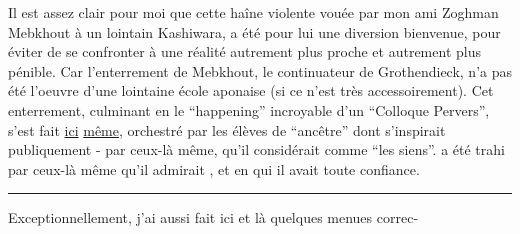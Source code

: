 Il est assez clair pour moi que cette haîne violente vouée par mon ami Zoghman Mebkhout à un lointain Kashiwara, a été pour lui une diversion bienvenue, pour éviter de se confronter à une réalité autrement plus proche et autrement plus pénible. Car l'enterrement de Mebkhout, le continuateur  de Grothendieck, n'a pas été l'oeuvre d'une lointaine école aponaise (si ce n'est très accessoirement). Cet enterrement, culminant en le ``happening'' incroyable d'un ``Colloque Pervers'', s'est fait \uline{ici} \uline{même},  orchestré par les élèves de  ``ancêtre'' dont   s'inspirait  publiquement - par ceux-là même,  qu'il considérait comme ``les siens''.   a été trahi par ceux-là même qu'il admirait , et en qui il avait toute confiance.

\noindent\rule{3cm}{0.4pt}

\handwritten{(*)} Exceptionnellement, j'ai aussi fait ici et là quelques menues correc-
